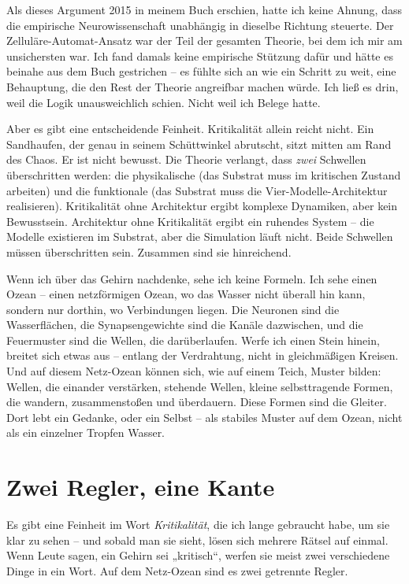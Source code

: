 \documentclass[11pt, twoside, openright]{book}
\begin{document}
Als dieses Argument 2015 in meinem Buch erschien, hatte ich keine Ahnung, dass die empirische Neurowissenschaft unabhängig in dieselbe Richtung steuerte. Der Zelluläre-Automat-Ansatz war der Teil der gesamten Theorie, bei dem ich mir am unsichersten war. Ich fand damals keine empirische Stützung dafür und hätte es beinahe aus dem Buch gestrichen -- es fühlte sich an wie ein Schritt zu weit, eine Behauptung, die den Rest der Theorie angreifbar machen würde. Ich ließ es drin, weil die Logik unausweichlich schien. Nicht weil ich Belege hatte.

Aber es gibt eine entscheidende Feinheit. Kritikalität allein reicht nicht. Ein Sandhaufen, der genau in seinem Schüttwinkel abrutscht, sitzt mitten am Rand des Chaos. Er ist nicht bewusst. Die Theorie verlangt, dass \textit{zwei} Schwellen überschritten werden: die physikalische (das Substrat muss im kritischen Zustand arbeiten) und die funktionale (das Substrat muss die Vier-Modelle-Architektur realisieren). Kritikalität ohne Architektur ergibt komplexe Dynamiken, aber kein Bewusstsein. Architektur ohne Kritikalität ergibt ein ruhendes System -- die Modelle existieren im Substrat, aber die Simulation läuft nicht. Beide Schwellen müssen überschritten sein. Zusammen sind sie hinreichend.

Wenn ich über das Gehirn nachdenke, sehe ich keine Formeln. Ich sehe einen Ozean -- einen netzförmigen Ozean, wo das Wasser nicht überall hin kann, sondern nur dorthin, wo Verbindungen liegen. Die Neuronen sind die Wasserflächen, die Synapsengewichte sind die Kanäle dazwischen, und die Feuermuster sind die Wellen, die darüberlaufen. Werfe ich einen Stein hinein, breitet sich etwas aus -- entlang der Verdrahtung, nicht in gleichmäßigen Kreisen. Und auf diesem Netz-Ozean können sich, wie auf einem Teich, Muster bilden: Wellen, die einander verstärken, stehende Wellen, kleine selbsttragende Formen, die wandern, zusammenstoßen und überdauern. Diese Formen sind die Gleiter. Dort lebt ein Gedanke, oder ein Selbst -- als stabiles Muster auf dem Ozean, nicht als ein einzelner Tropfen Wasser.

\section*{Zwei Regler, eine Kante}

Es gibt eine Feinheit im Wort \textit{Kritikalität}, die ich lange gebraucht habe, um sie klar zu sehen -- und sobald man sie sieht, lösen sich mehrere Rätsel auf einmal. Wenn Leute sagen, ein Gehirn sei „kritisch“, werfen sie meist zwei verschiedene Dinge in ein Wort. Auf dem Netz-Ozean sind es zwei getrennte Regler.
\end{document}
